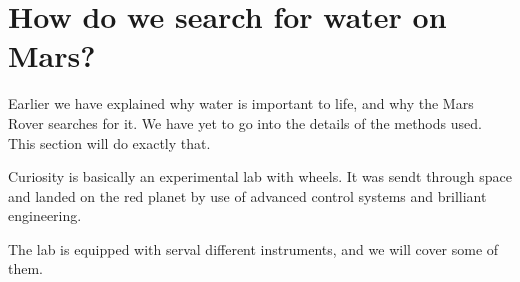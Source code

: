\section*{How do we search for water on Mars?}
Earlier we have explained why water is important to life, and why the Mars Rover searches for it.
We have yet to go into the details of the methods used.
This section will do exactly that.


Curiosity is basically an experimental lab with wheels.
It was sendt through space and landed on the red planet by use of advanced control systems and brilliant engineering.

The lab is equipped with serval different instruments, and we will cover some of them.
